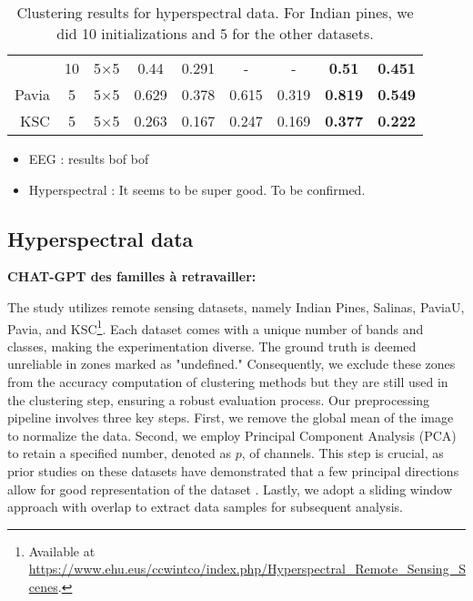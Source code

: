 \documentclass{article}
\theoremstyle{plain}
\theoremstyle{definition}
\theoremstyle{remark}
\begin{document}
\begin{table*}[t]
\begin{tabular}{rcccccccc}
                              & 10            & 5$\times$5            & 0.44            & 0.291 & -            & -           & \textbf{0.51}  & \textbf{0.451} \\ \cline{2-9} 
Pavia                         & 5             & 5$\times$5            & 0.629           & 0.378 & 0.615        & 0.319       & \textbf{0.819} & \textbf{0.549} \\ \cline{2-9} 
KSC                           & 5             & 5$\times$5   & 0.263           & 0.167 & 0.247        & 0.169       & \textbf{0.377} & \textbf{0.222}
\end{tabular}
\caption{Clustering results for hyperspectral data. For Indian pines, we did 10 initializations and 5 for the other datasets.}
\label{tab: hyperspectral}
\end{table*}


\begin{itemize}
    \item EEG : results bof bof
    \item Hyperspectral : It seems to be super good. To be confirmed.
\end{itemize}

\subsection{Hyperspectral data}

\textbf{CHAT-GPT des familles à retravailler:}

The study utilizes remote sensing datasets, namely Indian Pines, Salinas, PaviaU, Pavia, and KSC\footnote{Available at \url{https://www.ehu.eus/ccwintco/index.php/Hyperspectral_Remote_Sensing_Scenes}.}. Each dataset comes with a unique number of bands and classes, making the experimentation diverse. The ground truth is deemed unreliable in zones marked as "undefined." Consequently, we exclude these zones from the accuracy computation of clustering methods but they are still used in the clustering step, ensuring a robust evaluation process. Our preprocessing pipeline involves three key steps. First, we remove the global mean of the image to normalize the data. Second, we employ Principal Component Analysis (PCA) to retain a specified number, denoted as $p$, of channels. This step is crucial, as prior studies on these datasets have demonstrated that a few principal directions allow for good representation of the dataset \cite{9627641}. Lastly, we adopt a sliding window approach with overlap to extract data samples for subsequent analysis.
\end{document}
